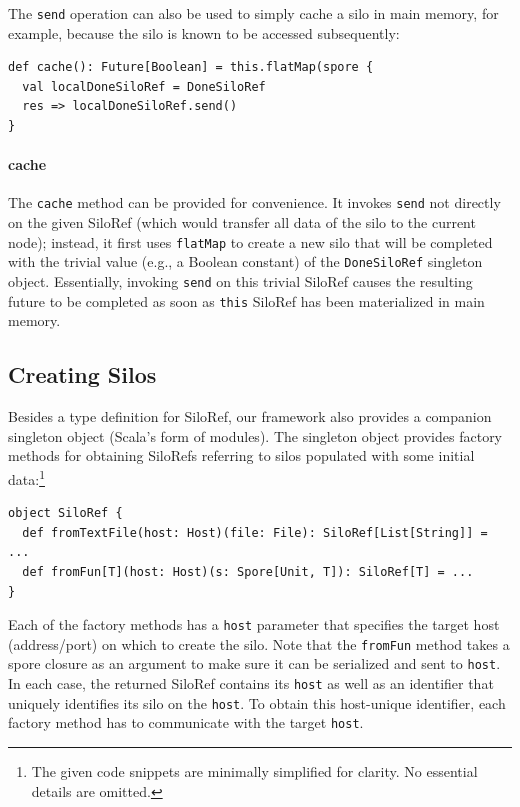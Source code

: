 \documentclass{sigplanconf}
\theoremstyle{definition}
\theoremstyle{definition}
\begin{document}
The \verb|send| operation can also be used to simply cache a silo in main
memory, for example, because the silo is known to be accessed subsequently:

\begin{lstlisting}
def cache(): Future[Boolean] = this.flatMap(spore {
  val localDoneSiloRef = DoneSiloRef
  res => localDoneSiloRef.send()
}
\end{lstlisting}

\paragraph{cache}
The \verb|cache| method can be provided for convenience. It invokes
\verb|send| not directly on the given SiloRef (which would transfer all data
of the silo to the current node); instead, it first uses \verb|flatMap| to
create a new silo that will be completed with the trivial value (e.g., a
Boolean constant) of the \verb|DoneSiloRef| singleton object. Essentially,
invoking \verb|send| on this trivial SiloRef causes the resulting future to be
completed as soon as \verb|this| SiloRef has been materialized in main memory.



\subsection{Creating Silos}
\label{sec:creating-silos}

Besides a type definition for SiloRef, our framework also provides a companion
singleton object (Scala's form of modules). The singleton object provides
factory methods for obtaining SiloRefs referring to silos populated with some
initial data:\footnote{The given code snippets are minimally simplified for
clarity. No essential details are omitted.}

\begin{lstlisting}
object SiloRef {
  def fromTextFile(host: Host)(file: File): SiloRef[List[String]] = ...
  def fromFun[T](host: Host)(s: Spore[Unit, T]): SiloRef[T] = ...
}
\end{lstlisting}

Each of the factory methods has a \verb|host| parameter that specifies the
target host (address/port) on which to create the silo. Note that the
\verb|fromFun| method takes a spore closure as an argument to make sure it can
be serialized and sent to \verb|host|. In each case, the returned SiloRef
contains its \verb|host| as well as an identifier that uniquely identifies its
silo on the \verb|host|. To obtain this host-unique identifier, each factory
method has to communicate with the target \verb|host|.
\end{document}
